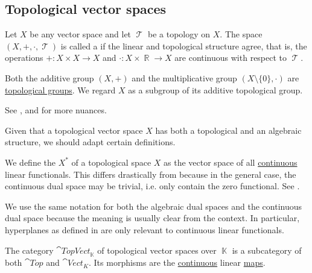 \subsection{Topological vector spaces}\label{subsec:topological_vector_spaces}

\begin{definition}\label{def:topological_vector_space}
  Let \( X \) be any vector space and let \( \mscrT \) be a topology on \( X \). The space \( (X, +, \cdot, \mscrT) \) is called a  if the linear and topological structure agree, that is, the operations \( +: X \times X \to X \) and \( \cdot: X \times \BbbR \to X \) are continuous with respect to \( \mscrT \).

  Both the additive group \( (X, +) \) and the multiplicative group \( (X \setminus \{ 0 \}, \cdot) \) are \hyperref[def:topological_group]{topological groups}. We regard \( X \) as a subgroup of its additive topological group.

  See ,  and  for more nuances.
\end{definition}

Given that a topological vector space \( X \) has both a topological and an algebraic structure, we should adapt certain definitions.

\begin{definition}\label{def:continuous_dual_space}
  We define the  \( X^* \) of a topological space \( X \) as the vector space of all \hyperref[def:global_continuity]{continuous} linear functionals. This differs drastically from  because in the general case, the continuous dual space may be trivial, i.e. only contain the zero functional. See .

  We use the same notation for both the algebraic dual spaces and the continuous dual space because the meaning is usually clear from the context. In particular, hyperplanes as defined in  are only relevant to continuous linear functionals.
\end{definition}

\begin{definition}\label{def:category_of_topological_vector_spaces}
  The category \( \cat{TopVect}_{\BbbK} \) of topological vector spaces over \( \BbbK \) is a subcategory of both \( \cat{Top} \) and \( \cat{Vect}_K \). Its morphisms are the \hyperref[def:global_continuity]{continuous} linear \hyperref[def:linear_operator]{maps}.
\end{definition}

